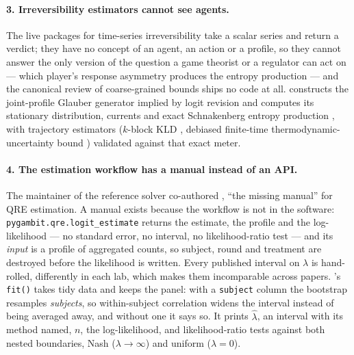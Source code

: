 \paragraph{3. Irreversibility estimators cannot see agents.} The live packages
for time-series irreversibility take a scalar series and return a verdict; they
have no concept of an agent, an action or a profile, so they cannot answer the
only version of the question a game theorist or a regulator can act on --- which
player's response asymmetry produces the entropy production --- and the canonical
review of coarse-grained bounds \citep{seifert2026} ships no code at all.
\strataq{} constructs the joint-profile Glauber generator implied by logit
revision and computes its stationary distribution, currents and exact
Schnakenberg entropy production \citep{schnakenberg1976}, with trajectory
estimators ($k$-block KLD \citep{roldan2010}, debiased finite-time
thermodynamic-uncertainty bound \citep{barato2015,horowitz2017}) validated
against that exact meter.

\paragraph{4. The estimation workflow has a manual instead of an API.} The
maintainer of the reference solver co-authored \citet{bland2025}, ``the missing
manual'' for QRE estimation. A manual exists because the workflow is not in the
software: \texttt{pygambit.qre.logit\_estimate} returns the estimate, the
profile and the log-likelihood --- no standard error, no interval, no
likelihood-ratio test --- and its \emph{input} is a profile of aggregated counts,
so subject, round and treatment are destroyed before the likelihood is written.
Every published interval on $\lambda$ is hand-rolled, differently in each lab,
which makes them incomparable across papers. \strataq{}'s \texttt{fit()} takes
tidy data and keeps the panel: with a \texttt{subject} column the bootstrap
resamples \emph{subjects}, so within-subject correlation widens the interval
instead of being averaged away, and without one it says so. It prints
$\hat\lambda$, an interval with its method named, $n$, the log-likelihood, and
likelihood-ratio tests against both nested boundaries, Nash
($\lambda\to\infty$) and uniform ($\lambda=0$).


